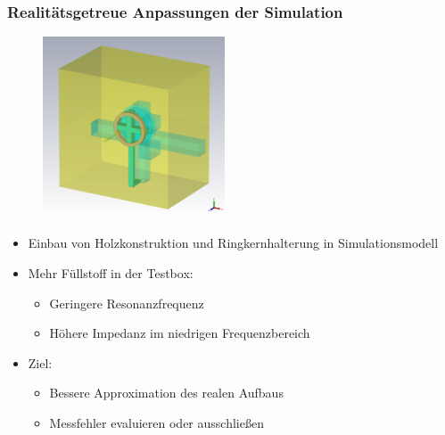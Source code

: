 \documentclass[accentcolor=tud9b, colorbacktitle, inverttitle]{tudbeamer}
\begin{document}
\begin{frame}\frametitle{Realit\"atsgetreue Anpassungen der Simulation}
\vspace{-1em}
\begin{multicols}{2}
\begin{figure}[h]
	\centering
	\includegraphics[width=0.48\textwidth]{KreuzPolygon}
\end{figure}
\vfill\null
\columnbreak
\begin{itemize}
	\item Einbau von Holzkonstruktion und Ringkernhalterung in Simulationsmodell
	\item Mehr F\"ullstoff in der Testbox:
	\begin{itemize}
		\item Geringere Resonanzfrequenz
		\item H\"ohere Impedanz im niedrigen Frequenzbereich
	\end{itemize}
	\item Ziel:
	\begin{itemize}
		\item Bessere Approximation des realen Aufbaus
		\item Messfehler evaluieren oder ausschlie\ss{}en
	\end{itemize}
\end{itemize}
\vfill\null
\end{multicols}
\end{frame}
\end{document}
